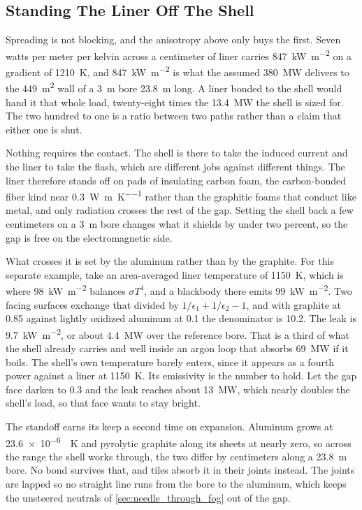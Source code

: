 \documentclass{article}
\begin{document}
\subsection*{Standing The Liner Off The Shell}
Spreading is not blocking, and the anisotropy above only buys the first. Seven watts per meter per kelvin across a centimeter of liner carries \SI{847}{\kilo\watt\per\square\meter} on a gradient of \SI{1210}{\kelvin}, and \SI{847}{\kilo\watt\per\square\meter} is what the assumed \SI{380}{\mega\watt} delivers to the \SI{449}{\square\meter} wall of a \SI{3}{\meter} bore \SI{23.8}{\meter} long. A liner bonded to the shell would hand it that whole load, twenty-eight times the \SI{13.4}{\mega\watt} the shell is sized for. The two hundred to one is a ratio between two paths rather than a claim that either one is shut.

Nothing requires the contact. The shell is there to take the induced current and the liner to take the flash, which are different jobs against different things. The liner therefore stands off on pads of insulating carbon foam, the carbon-bonded fiber kind near \SI{0.3}{\watt\per\meter\per\kelvin} rather than the graphitic foams that conduct like metal, and only radiation crosses the rest of the gap. Setting the shell back a few centimeters on a \SI{3}{\meter} bore changes what it shields by under two percent, so the gap is free on the electromagnetic side.

What crosses it is set by the aluminum rather than by the graphite. For this separate example, take an area-averaged liner temperature of \SI{1150}{\kelvin}, which is where \SI{98}{\kilo\watt\per\square\meter} balances $\sigma T^4$, and a blackbody there emits \SI{99}{\kilo\watt\per\square\meter}. Two facing surfaces exchange that divided by $1/\epsilon_1 + 1/\epsilon_2 - 1$, and with graphite at \num{0.85} against lightly oxidized aluminum at \num{0.1} the denominator is \num{10.2}. The leak is \SI{9.7}{\kilo\watt\per\square\meter}, or about \SI{4.4}{\mega\watt} over the reference bore. That is a third of what the shell already carries and well inside an argon loop that absorbs \SI{69}{\mega\watt} if it boils. The shell's own temperature barely enters, since it appears as a fourth power against a liner at \SI{1150}{\kelvin}. Its emissivity is the number to hold. Let the gap face darken to \num{0.3} and the leak reaches about \SI{13}{\mega\watt}, which nearly doubles the shell's load, so that face wants to stay bright.

The standoff earns its keep a second time on expansion. Aluminum grows at \SI{23.6e-6}{\per\kelvin} and pyrolytic graphite along its sheets at nearly zero, so across the range the shell works through, the two differ by centimeters along a \SI{23.8}{\meter} bore. No bond survives that, and tiles absorb it in their joints instead. The joints are lapped so no straight line runs from the bore to the aluminum, which keeps the unsteered neutrals of \autoref{sec:needle_through_fog} out of the gap.
\end{document}
